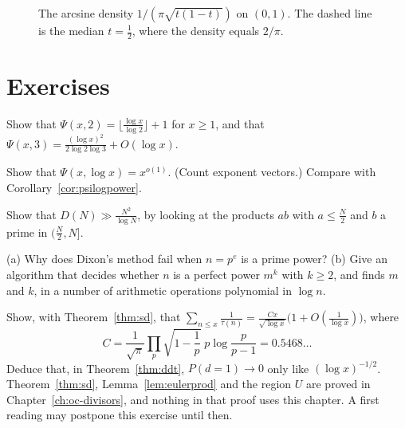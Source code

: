 \begin{figure}[ht]
\centering
{}
\caption{The arcsine density \(1/(\pi\sqrt{t(1-t)})\) on \((0,1)\). The dashed line is the median \(t=\tfrac12\), where the density equals \(2/\pi\).}
\label{fig:v15c01-arcsine}
\end{figure}

\section{Exercises}

\begin{exercise}[$\star$]\label{ex:psi23}
Show that $\Psi(x,2)=\lfloor\frac{\log x}{\log2}\rfloor+1$ for $x\ge1$, and that $\Psi(x,3)=\frac{(\log x)^2}{2\log2\log3}+O(\log x)$.
\end{exercise}

\begin{exercise}[$\star\star$]\label{ex:psilog}
Show that $\Psi(x,\log x)=x^{o(1)}$. (Count exponent vectors.) Compare with Corollary~\ref{cor:psilogpower}.
\end{exercise}

\begin{exercise}[$\star$]\label{ex:tablelower}
Show that $D(N)\gg\frac{N^2}{\log N}$, by looking at the products $ab$ with $a\le\frac N2$ and $b$ a prime in $(\frac N2,N]$.
\end{exercise}

\begin{exercise}[$\star\star$]\label{ex:primepower}
(a) Why does Dixon's method fail when $n=p^e$ is a prime power? (b) Give an algorithm that decides whether $n$ is a perfect power $m^k$ with $k\ge2$, and finds $m$ and $k$, in a number of arithmetic operations polynomial in $\log n$.
\end{exercise}

\begin{exercise}[$\star\star$]\label{ex:invtau}
Show, with Theorem~\ref{thm:sd}, that $\sum_{n\le x}\frac1{\tau(n)}=\frac{Cx}{\sqrt{\log x}}\bigl(1+O(\frac1{\log x})\bigr)$, where
\[
C=\frac1{\sqrt\pi}\prod_p\sqrt{1-\frac1p}\;p\log\frac p{p-1}=0.5468\ldots
\]
Deduce that, in Theorem~\ref{thm:ddt}, $P(d=1)\to0$ only like $(\log x)^{-1/2}$. Theorem~\ref{thm:sd}, Lemma~\ref{lem:eulerprod} and the region $U$ are proved in Chapter~\ref{ch:oc-divisors}, and nothing in that proof uses this chapter. A first reading may postpone this exercise until then.
\end{exercise}

